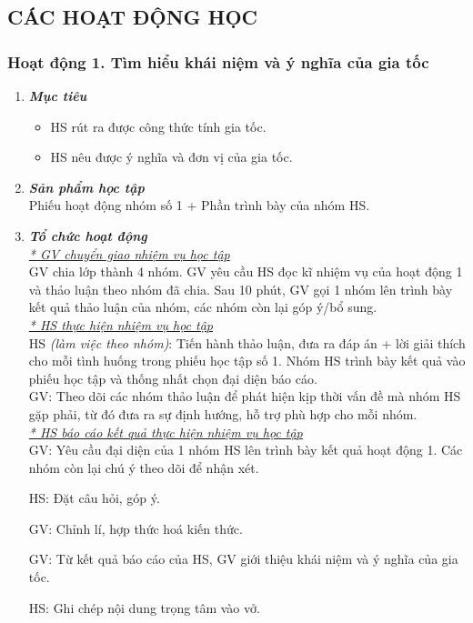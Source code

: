 \subsection{CÁC HOẠT ĐỘNG HỌC}
\subsubsection{Hoạt động 1. Tìm hiểu khái niệm và ý nghĩa của gia tốc}
\begin{enumerate}[label=\bfseries\itshape \arabic*.]
	\item \textit{\textbf{Mục tiêu}}\\
	\begin{itemize}[topsep=0pt]
		\item HS rút ra được công thức tính gia tốc.
		\item HS nêu được ý nghĩa và đơn vị của gia tốc.
		
	\end{itemize}
\item \textit{\textbf{Sản phẩm học tập}}\\
Phiếu hoạt động nhóm số 1 + Phần trình bày của nhóm HS.
\item \textit{\textbf{Tổ chức hoạt động}}\\
\textit{\underline{* GV chuyển giao nhiệm vụ học tập}}\\
GV chia lớp thành 4 nhóm. GV yêu cầu HS đọc kĩ nhiệm vụ của hoạt động 1 và thảo luận theo nhóm đã chia. Sau 10 phút, GV gọi 1 nhóm lên trình bày kết quả thảo luận của nhóm, các nhóm còn lại góp ý/bổ sung.\\
\textit{\underline{* HS thực hiện nhiệm vụ học tập}}\\
HS \textit{(làm việc theo nhóm)}: Tiến hành thảo luận, đưa ra đáp án + lời giải thích cho mỗi tình huống trong phiếu học tập số 1. Nhóm HS trình bày kết quả vào phiếu học tập và thống nhất chọn đại diện báo cáo.\\
GV: Theo dõi các nhóm thảo luận để phát hiện kịp thời vấn đề mà nhóm HS gặp phải, từ đó đưa ra sự định hướng, hỗ trợ phù hợp cho mỗi nhóm.\\
\textit{\underline{* HS báo cáo kết quả thực hiện nhiệm vụ học tập}}\\
GV: Yêu cầu đại diện của 1 nhóm HS lên trình bày kết quả hoạt động 1. Các nhóm còn lại chú ý theo dõi để nhận xét.

HS: Đặt câu hỏi, góp ý.

GV: Chỉnh lí, hợp thức hoá kiến thức.

GV: Từ kết quả báo cáo của HS, GV giới thiệu khái niệm và ý nghĩa của gia tốc.

HS: Ghi chép nội dung trọng tâm vào vở.
\end{enumerate}
